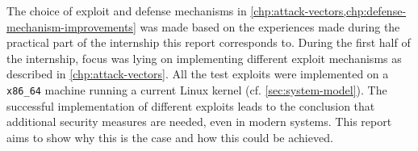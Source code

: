 The choice of exploit and defense mechanisms in \cref{chp:attack-vectors,chp:defense-mechanism-improvements} was made based on the experiences made during the practical part of the internship this report corresponds to.
During the first half of the internship, focus was lying on implementing different exploit mechanisms as described in \cref{chp:attack-vectors}.
All the test exploits were implemented on a \texttt{x86\_64} machine running a current Linux kernel (cf. \cref{sec:system-model}).
The successful implementation of different exploits leads to the conclusion that additional security measures are needed, even in modern systems.
This report aims to show why this is the case and how this could be achieved.